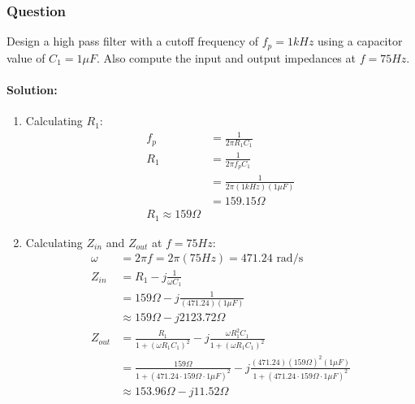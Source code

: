 \subsubsection{Question}
Design a high pass filter with a cutoff frequency of
\(f_p = 1kHz\) using a capacitor value of \(C_1 = 1\mu F\).
Also compute the input and output impedances at
\(f = 75Hz\).
\paragraph{Solution:}
\begin{enumerate}
  \item Calculating \(R_1\):
  \begin{align*}
    f_p &= \frac{1}{2 \pi R_1 C_1} \\
    R_1 &= \frac{1}{2 \pi f_p C_1} \\
    &= \frac{1}{2 \pi (1kHz)(1\mu F)} \\
    &= 159.15 \Omega \\
    \boxed{R_1 \approx 159 \Omega}
  \end{align*}
  \item Calculating \(Z_{in}\) and \(Z_{out}\) at \(f = 75Hz\):
  \begin{align*}
    \omega &= 2 \pi f = 2 \pi (75Hz) = 471.24 \text{ rad/s} \\
    Z_{in} &= R_1 - j \frac{1}{\omega C_1} \\
           &= 159 \Omega - j \frac{1}{(471.24)(1\mu F)} \\
           &\approx 159 \Omega - j 2123.72 \Omega \\
    Z_{out} &= \frac{R_1}{1 + (\omega R_1 C_1)^2} - j \frac{\omega R_1^2 C_1}{1 + (\omega R_1 C_1)^2} \\
            &= \frac{159 \Omega}{1 + (471.24 \cdot 159 \Omega \cdot 1\mu F)^2} - j \frac{(471.24)(159 \Omega)^2 (1\mu F)}{1 + (471.24 \cdot 159 \Omega \cdot 1\mu F)^2} \\
            &\approx 153.96 \Omega - j 11.52 \Omega
  \end{align*}
\end{enumerate}
